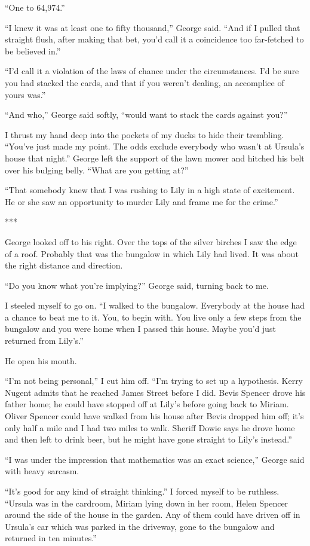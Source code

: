 {“One to 64,974.”

“I knew it was at least one to fifty thousand,” George said. “And if I pulled that straight flush, after making that bet, you’d call it a coincidence too far-fetched to be believed in.”

“I’d call it a violation of the laws of chance under the circumstances. I’d be sure you had stacked the cards, and that if you weren’t dealing, an accomplice of yours was.”

“And who,” George said softly, “would want to stack the cards against you?”

I thrust my hand deep into the pockets of my ducks to hide their trembling. “You’ve just made my point. The odds exclude everybody who wasn’t at Ursula’s house that night.” George left the support of the lawn mower and hitched his belt over his bulging belly. “What are you getting at?”

“That somebody knew that I was rushing to Lily in a high state of excitement. He or she saw an opportunity to murder Lily and frame me for the crime.”

***

George looked off to his right. Over the tops of the silver birches I saw the edge of a roof. Probably that was the bungalow in which Lily had lived. It was about the right distance and direction.

“Do you know what you’re implying?” George said, turning back to me.

I steeled myself to go on. “I walked to the bungalow. Everybody at the house had a chance to beat me to it. You, to begin with. You live only a few steps from the bungalow and you were home when I passed this house. Maybe you’d just returned from Lily’s.”

He open his mouth.

“I’m not being personal,” I cut him off. “I’m trying to set up a hypothesis. Kerry Nugent admits that he reached James Street before I did. Bevis Spencer drove his father home; he could have stopped off at Lily’s before going back to Miriam. Oliver Spencer could have walked from his house after Bevis dropped him off; it’s only half a mile and I had two miles to walk. Sheriff Dowie says he drove home and then left to drink beer, but he might have gone straight to Lily’s instead.”

“I was under the impression that mathematics was an exact science,” George said with heavy sarcasm.

“It’s good for any kind of straight thinking.” I forced myself to be ruthless. “Ursula was in the cardroom, Miriam lying down in her room, Helen Spencer around the side of the house in the garden. Any of them could have driven off in Ursula’s car which was parked in the driveway, gone to the bungalow and returned in ten minutes.”

}
